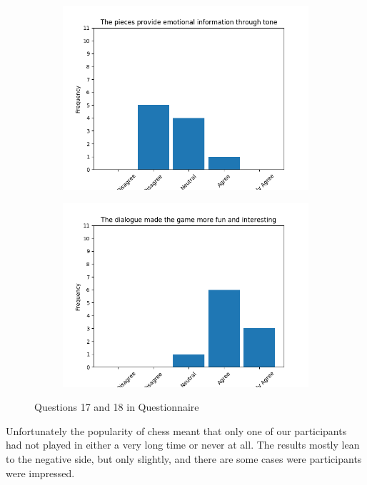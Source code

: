\documentclass{article}
\begin{document}
\begin{figure}[!ht]
\centering
\begin{subfigure}{.5\textwidth}
    \centering
    \includegraphics[width=\textwidth]{images/questions/16}
\end{subfigure}%
\begin{subfigure}{.5\textwidth}
    \centering
    \includegraphics[width=\textwidth]{images/questions/17}
\end{subfigure}
\caption[short]{Questions 17 and 18 in Questionnaire} \label{fig:qlast}
\end{figure}

Unfortunately the popularity of chess meant that only one of our participants had not played in either a very long time or never at all. The results mostly lean to the negative side, but only slightly, and there are some cases were participants were impressed.
\end{document}
